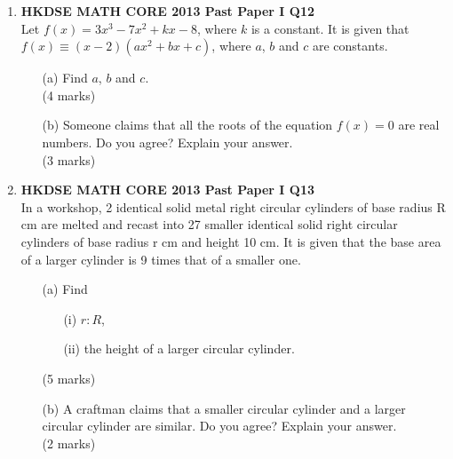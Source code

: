 \documentclass[12pt]{article}
\begin{document}
\begin{enumerate}
	\item \textbf{HKDSE MATH CORE 2013 Past Paper I Q12}\\
	Let  $f(x) = 3x^3 - 7x^2 + kx - 8$, where $k$ is a constant. It is given that $f(x) \equiv (x - 2)(ax^2 + bx + c)$, where $a$, $b$ and $c$ are constants.
	\begin{enumerate}
		\item[(a)] Find $a$, $b$ and $c$. \\(4 marks)
		\item[(b)] Someone claims that all the roots of the equation  $f(x) = 0$ are real numbers. Do you agree? Explain your answer. \\(3 marks)
	\end{enumerate}

	\item \textbf{HKDSE MATH CORE 2013 Past Paper I Q13}\\
	In a workshop, 2 identical solid metal right circular cylinders of base radius R cm are melted and recast into 27 smaller identical solid right circular cylinders of base radius r cm and height 10 cm. It is given that the base area of a larger cylinder is 9 times that of a smaller one.
	\begin{enumerate}
		\item[(a)] Find
		\begin{enumerate}
			\item[(i)] $r : R$,
			\item[(ii)] the height of a larger circular cylinder.
		\end{enumerate}
		(5 marks)
		\item[(b)] A craftman claims that a smaller circular cylinder and a larger circular cylinder are similar. Do you agree? Explain your answer. \\(2 marks)
	\end{enumerate}


\end{enumerate}
\end{document}
